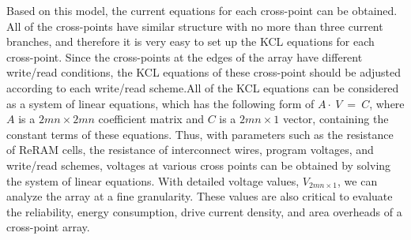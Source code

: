 Based on this model, the current equations for each cross-point can be
obtained. All of the cross-points have similar structure with no more than
three current branches, and therefore it is very easy to set up the KCL
equations for each cross-point. Since the cross-points at the edges of the
array have different write/read conditions, the KCL equations of these
cross-point should be adjusted according to each write/read scheme.All of
the KCL equations can be considered as a system of linear equations, which
has the following form of {$ A\cdot~V~=~C $}, where $A$ is a
${2mn\times{2mn}}$ coefficient matrix and $C$ is a ${2mn\times{1}}$
vector, containing the constant terms of these equations. Thus, with
parameters such as the resistance of ReRAM cells, the resistance of
interconnect wires, program voltages, and write/read schemes, voltages at
various cross points can be obtained by solving the system of linear
equations. With detailed voltage values, $V_{2mn{\times}1}$, we can
analyze the array at a fine granularity. These values are also critical to
evaluate the reliability, energy consumption, drive current density, and
area overheads of a cross-point array.

